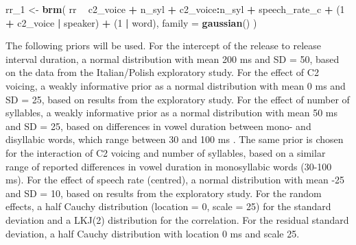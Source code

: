 \documentclass[11pt,]{article}
\newenvironment{Shaded}{\begin{snugshade}}{\end{snugshade}}
\newcommand{\KeywordTok}[1]{\textcolor[rgb]{0.13,0.29,0.53}{\textbf{#1}}}
\newcommand{\DataTypeTok}[1]{\textcolor[rgb]{0.13,0.29,0.53}{#1}}
\newcommand{\DecValTok}[1]{\textcolor[rgb]{0.00,0.00,0.81}{#1}}
\newcommand{\StringTok}[1]{\textcolor[rgb]{0.31,0.60,0.02}{#1}}
\newcommand{\OperatorTok}[1]{\textcolor[rgb]{0.81,0.36,0.00}{\textbf{#1}}}
\newcommand{\NormalTok}[1]{#1}
\begin{document}
\begin{Shaded}
\begin{Highlighting}[]
\NormalTok{rr_}\DecValTok{1}\NormalTok{ <-}\StringTok{ }\KeywordTok{brm}\NormalTok{(}
\NormalTok{  rr }\OperatorTok{~}
\StringTok{    }\NormalTok{c2_voice }\OperatorTok{+}
\StringTok{    }\NormalTok{n_syl }\OperatorTok{+}
\StringTok{    }\NormalTok{c2_voice}\OperatorTok{:}\NormalTok{n_syl }\OperatorTok{+}
\StringTok{    }\NormalTok{speech_rate_c }\OperatorTok{+}
\StringTok{    }\NormalTok{(}\DecValTok{1} \OperatorTok{+}\StringTok{ }\NormalTok{c2_voice }\OperatorTok{|}\StringTok{ }\NormalTok{speaker) }\OperatorTok{+}
\StringTok{    }\NormalTok{(}\DecValTok{1} \OperatorTok{|}\StringTok{ }\NormalTok{word),}
  \DataTypeTok{family =} \KeywordTok{gaussian}\NormalTok{()}
\NormalTok{)}
\end{Highlighting}
\end{Shaded}

The following priors will be used. For the intercept of the release to
release interval duration, a normal distribution with mean 200 ms and SD
= 50, based on the data from the Italian/Polish exploratory study. For
the effect of C2 voicing, a weakly informative prior as a normal
distribution with mean 0 ms and SD = 25, based on results from the
exploratory study. For the effect of number of syllables, a weakly
informative prior as a normal distribution with mean 50 ms and SD = 25,
based on differences in vowel duration between mono- and disyllabic
words, which range between 30 and 100 ms \citep{sharf1962, klatt1973}.
The same prior is chosen for the interaction of C2 voicing and number of
syllables, based on a similar range of reported differences in vowel
duration in monosyllabic words (30-100 ms). For the effect of speech
rate (centred), a normal distribution with mean -25 and SD = 10, based
on results from the exploratory study. For the random effects, a half
Cauchy distribution (location = 0, scale = 25) for the standard
deviation and a LKJ(2) distribution for the correlation. For the
residual standard deviation, a half Cauchy distribution with location 0
ms and scale 25.
\end{document}
